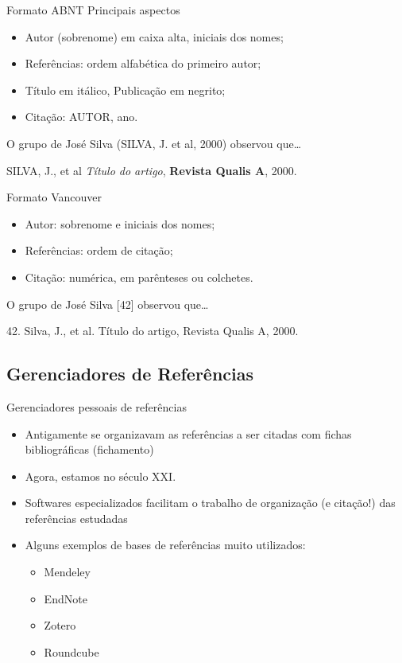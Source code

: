 \documentclass{beamer}
\begin{document}
\begin{frame}{Formato ABNT}
  Principais aspectos
  \begin{itemize}
  \item Autor (sobrenome) em caixa alta, iniciais dos nomes;
  \item Referências: ordem alfabética do primeiro autor;
  \item Título em itálico, Publicação em negrito;
  \item Citação: AUTOR, ano.
  \end{itemize}
  \begin{example}[Citação]
    O grupo de José Silva (SILVA, J. et al, 2000) observou que\ldots
  \end{example}
  \begin{example}[Referência]
    SILVA, J., et al {\em Título do artigo}, {\bf Revista Qualis A},
    2000.
  \end{example}
\end{frame}

\begin{frame}{Formato Vancouver}
  \begin{itemize}
  \item Autor: sobrenome e iniciais dos nomes;
  \item Referências: ordem de citação;
  \item Citação: numérica, em parênteses ou colchetes.
  \end{itemize}
  \begin{example}[Citação]
    O grupo de José Silva [42] observou que\ldots
  \end{example}
  \begin{example}[Referência]
    42. Silva, J., et al. Título do artigo, Revista Qualis A, 2000.
  \end{example}
\end{frame}
\subsection{Gerenciadores de Referências}

\begin{frame}{Gerenciadores pessoais de referências}
  \begin{itemize}
  \item Antigamente se organizavam as referências a ser citadas com
    fichas bibliográficas (fichamento)
  \item Agora, estamos no século XXI.
  \item Softwares especializados facilitam o trabalho de organização
    (e citação!) das referências estudadas
  \item Alguns exemplos de bases de referências muito utilizados:
    \begin{itemize}
    \item<4-> \alert<5->{Mendeley}
    \item<4-> EndNote
    \item<4-> Zotero
    \item<4-> Roundcube
    \end{itemize}
  \end{itemize}
\end{frame}
\end{document}
